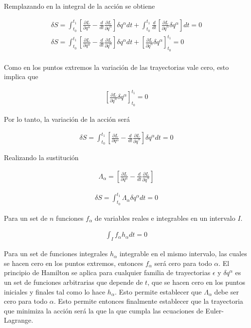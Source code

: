 Remplazando en la integral de la acción se obtiene 

\begin{gather*}
    \delta S = \int_{t_0}^{t_1} \left[ \frac{\partial L}{\partial q^{\alpha}}- \frac{d}{dt}\frac{\partial L}{\partial \dot{q}^{\alpha}} \right]\delta q^{\alpha}dt + \int_{t_0}^{t_1}\frac{d}{dt}\left[\frac{\partial L}{\partial \dot{q}^{\alpha}}\delta q^{\alpha}\right]dt = 0\\
    \delta S = \int_{t_0}^{t_1} \left[ \frac{\partial L}{\partial q^{\alpha}}- \frac{d}{dt}\frac{\partial L}{\partial \dot{q}^{\alpha}} \right]\delta q^{\alpha}dt + \left[\frac{\partial L}{\partial \dot{q}^{\alpha}}\delta q^{\alpha}\right]_{t_0}^{t_1} = 0\\
\end{gather*}

Como en los puntos extremos la variación de las trayectorias vale cero, esto implica que 

\begin{gather*}
    \left[\frac{\partial L}{\partial \dot{q}^{\alpha}}\delta q^{\alpha}\right]_{t_0}^{t_1} = 0
\end{gather*}

Por lo tanto, la variación de la acción será 

\begin{gather*}
    \delta S = \int_{t_0}^{t_1} \left[ \frac{\partial L}{\partial q^{\alpha}}- \frac{d}{dt}\frac{\partial L}{\partial \dot{q}^{\alpha}} \right]\delta q^{\alpha}dt = 0
\end{gather*}

Realizando la sustitución 

\begin{gather}
    \label{eq:sEL}\Lambda_\alpha =  \left[ \frac{\partial L}{\partial q^{\alpha}}- \frac{d}{dt}\frac{\partial L}{\partial \dot{q}^{\alpha}} \right]
\end{gather}

\begin{gather*}
    \delta S = \int_{t_0}^{t_1} \Lambda_{\alpha}\delta q^{\alpha}dt = 0
\end{gather*}


Para un set de $n$ funciones $f_{\alpha}$ de variables reales e integrables en un intervalo $I$.

\begin{gather*}
    \int_I f_{\alpha}h_{\alpha}dt = 0
\end{gather*}

Para un set de funciones integrales $h_{\alpha}$ integrable en el mismo intervalo, las cuales se hacen cero en los puntos extremos, entonces $f_{\alpha}$ será cero para todo $\alpha$. El principio de Hamilton se aplica para cualquier familia de trayectorias $\epsilon$ y $\delta q^{\alpha}$ es un set de funciones arbitrarias que depende de $t$, que se hacen cero en los puntos iniciales y finales tal como lo hace $h_\alpha$. Esto permite establecer que $\Lambda_\alpha$ debe ser cero para todo $\alpha$. Esto permite entonces finalmente establecer que la trayectoria que minimiza la acción será la que la que cumpla las ecuaciones de Euler-Lagrange.

